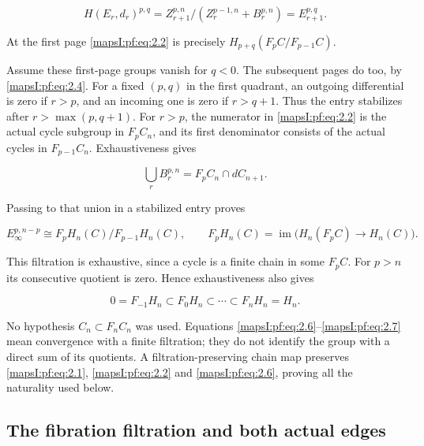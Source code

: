 \begin{equation}
H(E_r,d_r)^{p,q}
=Z_{r+1}^{p,n}/(Z_r^{p-1,n}+B_r^{p,n})
=E_{r+1}^{p,q}.
\label{mapsI:pf:eq:2.4}
\end{equation}

At the first page \eqref{mapsI:pf:eq:2.2} is precisely \(H_{p+q}(F_pC/F_{p-1}C)\).

Assume these first-page groups vanish for \(q<0\). The subsequent pages do too, by \eqref{mapsI:pf:eq:2.4}. For a fixed \((p,q)\) in the first quadrant, an outgoing differential is zero if \(r>p\), and an incoming one is zero if \(r>q+1\). Thus the entry stabilizes after \(r>\max(p,q+1)\). For \(r>p\), the numerator in \eqref{mapsI:pf:eq:2.2} is the actual cycle subgroup in \(F_pC_n\), and its first denominator consists of the actual cycles in \(F_{p-1}C_n\). Exhaustiveness gives

\begin{equation}
\bigcup_r B_r^{p,n}=F_pC_n\cap dC_{n+1}.
\label{mapsI:pf:eq:2.5}
\end{equation}

Passing to that union in a stabilized entry proves

\begin{equation}
E_\infty^{p,n-p}\cong F_pH_n(C)/F_{p-1}H_n(C),
\qquad
F_pH_n(C)=\operatorname{im}\bigl(H_n(F_pC)\to H_n(C)\bigr).
\label{mapsI:pf:eq:2.6}
\end{equation}

This filtration is exhaustive, since a cycle is a finite chain in some \(F_pC\). For \(p>n\) its consecutive quotient is zero. Hence exhaustiveness also gives

\begin{equation}
0=F_{-1}H_n\subset F_0H_n\subset\cdots\subset F_nH_n=H_n.
\label{mapsI:pf:eq:2.7}
\end{equation}

No hypothesis \(C_n\subset F_nC_n\) was used. Equations \eqref{mapsI:pf:eq:2.6}--\eqref{mapsI:pf:eq:2.7} mean convergence with a finite filtration; they do not identify the group with a direct sum of its quotients. A filtration-preserving chain map preserves \eqref{mapsI:pf:eq:2.1}, \eqref{mapsI:pf:eq:2.2} and \eqref{mapsI:pf:eq:2.6}, proving all the naturality used below.

\subsection{The fibration filtration and both actual edges}
\label{mapsI:pf:serre-homology}

